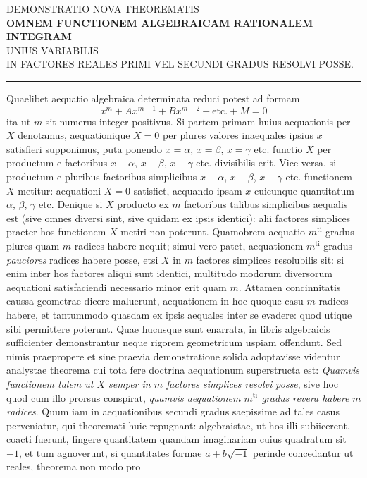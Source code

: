 \begin{center}\small
DEMONSTRATIO NOVA THEOREMATIS\\[5pt]
\textbf{OMNEM FUNCTIONEM ALGEBRAICAM RATIONALEM INTEGRAM}\\[5pt]
UNIUS VARIABILIS\\[5pt]
IN FACTORES REALES PRIMI VEL SECUNDI GRADUS RESOLVI POSSE.\\[8pt]
\rule{1.5cm}{0.3pt}
\end{center}
Quaelibet aequatio algebraica determinata reduci potest ad formam
\[
x^m+Ax^{m-1}+Bx^{m-2}+\text{etc.}+M=0
\]
ita ut $m$ sit numerus integer positivus. Si partem primam huius aequationis per
$X$ denotamus, aequationique $X=0$ per plures valores inaequales ipsius $x$ satisfieri supponimus, puta ponendo $x=\alpha$, $x=\beta$, $x=\gamma$ etc. functio $X$ per
productum e factoribus $x-\alpha$, $x-\beta$, $x-\gamma$ etc. divisibilis erit. Vice versa, si
productum e pluribus factoribus simplicibus $x-\alpha$, $x-\beta$, $x-\gamma$ etc. functionem
$X$ metitur: aequationi $X=0$ satisfiet, aequando ipsam $x$ cuicunque quantitatum $\alpha$, $\beta$, $\gamma$ etc. Denique si $X$ producto ex $m$ factoribus talibus simplicibus
aequalis est (sive omnes diversi sint, sive quidam ex ipsis identici): alii factores
simplices praeter hos functionem $X$ metiri non poterunt. Quamobrem aequatio
$m^{\mathrm{ti}}$ gradus plures quam $m$ radices habere nequit; simul vero patet, aequationem
$m^{\mathrm{ti}}$ gradus \textit{pauciores} radices habere posse, etsi $X$ in $m$ factores simplices resolubilis sit: si enim inter hos factores aliqui sunt identici, multitudo modorum diversorum aequationi satisfaciendi necessario minor erit quam $m$. Attamen concinnitatis caussa geometrae dicere maluerunt, aequationem in hoc quoque casu $m$
radices habere, et tantummodo quasdam ex ipsis aequales inter se evadere: quod
utique sibi permittere poterunt.
Quae hucusque sunt enarrata, in libris algebraicis sufficienter demonstrantur neque rigorem geometricum uspiam offendunt. Sed nimis praepropere et sine
praevia demonstratione solida adoptavisse videntur analystae theorema cui tota
fere doctrina aequationum superstructa est: \textit{Quamvis functionem talem ut $X$ semper in $m$ factores simplices resolvi posse}, sive hoc quod cum illo prorsus conspirat,
\textit{quamvis aequationem $m^{\mathrm{ti}}$ gradus revera habere $m$ radices}. Quum iam in aequationibus secundi gradus saepissime ad tales casus perveniatur, qui theoremati huic
repugnant: algebraistae, ut hos illi subiicerent, coacti fuerunt, fingere quantitatem quandam imaginariam cuius quadratum sit $-1$, et tum agnoverunt, si quantitates formae $a+b\sqrt{-1}$ perinde concedantur ut reales, theorema non modo pro
